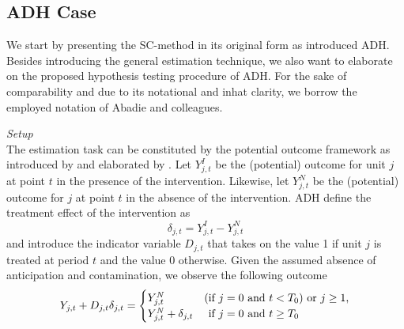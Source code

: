 \subsection{ADH Case}
We start by presenting the \ac{SC}-method in its original form as introduced \ac{ADH}. Besides introducing the general estimation technique, we also want to elaborate on the proposed hypothesis testing procedure of \ac{ADH}. For the sake of comparability and due to its notational and inhat clarity, we borrow the employed notation of Abadie and colleagues. 

\textit{Setup} \\
The estimation task can be constituted by the potential outcome framework as introduced by \cite{neyman:1923} and elaborated by \cite{rubin:1974}. Let $Y^{I}_{j,t}$ be the (potential) outcome for unit $j$ at point $t$ in the presence of the intervention. Likewise, let $Y^{N}_{j,t}$ be the (potential) outcome for $j$ at point $t$ in the absence of the intervention. \ac{ADH} define the treatment effect of the intervention as 
\[
\delta_{j,t} = Y^{I}_{j,t} - Y^{N}_{j,t}
\] 
and introduce the indicator variable $D_{j,t}$ that takes on the value 1 if unit $j$ is treated at period $t$ and the value 0 otherwise. Given the assumed absence of anticipation and contamination, we observe the following outcome
\[
Y_{j,t} + D_{j,t} \delta_{j,t} = 
\begin{cases}
	Y^{N}_{j,t} &\text{(if } j = 0 \text{ and } t < T_0\text{)} \text{ or } j \geq 1, \\
	Y^{N}_{j,t} + \delta_{j,t} &  \text{\phantom{(}if } j = 0 \text{ and } t \geq T_0
\end{cases}
\] 
